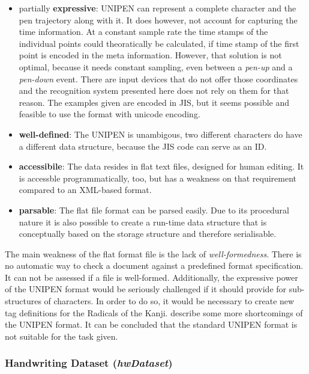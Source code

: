 \begin{itemize}
  \item partially \textbf{expressive}: UNIPEN can represent a complete character
        and the pen trajectory along with it. It does however, not account for
        capturing the time information. At a constant sample rate the time stamps
        of the individual points could theoratically be calculated, 
        if time stamp of the first point is encoded in the meta information. 
        However, that solution is not optimal, because it needs constant
        sampling, even between a \emph{pen-up} and a \emph{pen-down} event.
        There are input devices that do not offer those coordinates and the 
        recognition system presented here does not rely on them for that reason.
        The examples given are encoded in JIS, but it seems possible and feasible
        to use the format with unicode encoding.

  \item \textbf{well-defined}: The UNIPEN is unambigous, two different 
        characters do have a different data structure, because the JIS code 
        can serve as an ID.

  \item \textbf{accessibile}: The data resides in flat text files, designed for 
        human editing. It is accessble programmatically, too, but has a weakness
        on that requirement compared to an XML-based format.

  \item \textbf{parsable}: The flat file format can be parsed easily. Due to its
        procedural nature it is also possible to create a run-time data structure
        that is conceptually based on the storage structure and therefore
        serialisable.
\end{itemize}
The main weakness of the flat format file is the lack of \emph{well-formedness}.
There is no automatic way to check a document against a predefined format 
specification. It can not be assessed if a file is well-formed.
Additionally, the expressive power of the UNIPEN format would be seriously 
challenged if it should provide for sub-structures of characters.
In order to do so, it would be necessary to create new tag definitions for the 
Radicals of the Kanji.  \citeyear{Agrawal2005} 
describe some more shortcomings of the UNIPEN format. It can be concluded that 
the standard UNIPEN format is not suitable for the task given. 

\subsubsection{Handwriting Dataset (\emph{hwDataset})}
\label{sec:hwre:hwdataset}

